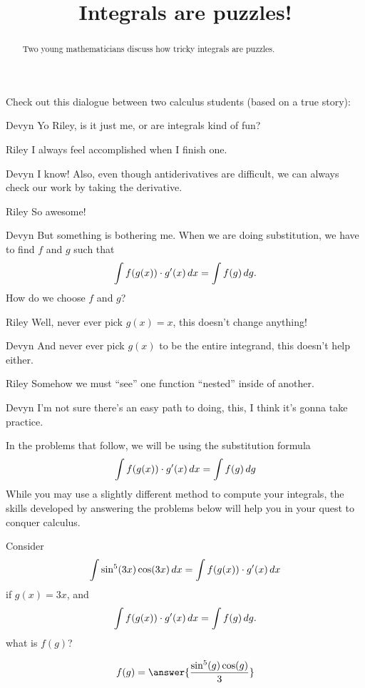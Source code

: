 \documentclass{ximera}
\title[Break-Ground:]{Integrals are puzzles!}
\begin{document}
\begin{abstract}
Two young mathematicians discuss how tricky integrals are puzzles.
\end{abstract}
\maketitle

Check out this dialogue between two calculus students (based on a true
story):

\begin{dialogue}
\item[Devyn] Yo Riley, is it just me, or are integrals kind of fun?
\item[Riley] I always feel accomplished when I finish one.
\item[Devyn] I know! Also, even though antiderivatives are difficult,
  we can always check our work by taking the derivative.
\item[Riley] So awesome!
\item[Devyn] But something is bothering me. When we are doing substitution,
  we have to find $f$ and $g$ such that
  \[
  \int f(g(x)) \cdot g'(x) \mathop{}\!d x = \int f(g) \mathop{}\!d g.
  \]
  How do we choose $f$ and $g$?
\item[Riley] Well, never ever pick $g(x) = x$, this doesn't change
    anything!
\item[Devyn] And never ever pick $g(x)$ to be the entire integrand,
  this doesn't help either.
\item[Riley] Somehow we must ``see'' one function ``nested'' inside of
  another.
\item[Devyn] I'm not sure there's an easy path to doing, this, I think
  it's gonna take practice.
\end{dialogue}


In the problems that follow, we will be using the substitution formula
\[
   \int f(g(x)) \cdot g'(x) \mathop{}\!d x = \int f(g) \mathop{}\!d
   g
\]
While you may use a slightly different method to compute your
integrals, the skills developed by answering the problems below will
help you in your quest to conquer calculus.

\begin{problem}
  Consider
  \[
  \int \sin^5(3x) \cos(3x) \mathop{}\!d x = \int f(g(x)) \cdot g'(x) \mathop{}\!d x
  \]
  if $g(x) = 3x$, and 
  \[
  \int f(g(x)) \cdot g'(x) \mathop{}\!d x = \int f(g) \mathop{}\!d g.
  \]
  what is $f(g)$?
  \begin{prompt}
    \[
    f(g) = \answer{
      \frac{\sin^5(g) \cos(g)}{3}}
    \]
  \end{prompt}
\end{problem}
\end{document}

